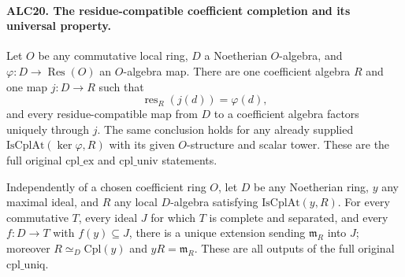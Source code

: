 \paragraph{ALC20. The residue-compatible coefficient completion and its universal property.}
\label{claim:ALC20}
Let \(O\) be any commutative local ring, \(D\) a
Noetherian \(O\)-algebra, and
\(\varphi:D\to\operatorname{Res}(O)\) an
\(O\)-algebra map.  There are one coefficient algebra
\(R\) and one map \(j:D\to R\) such that
\[
          \operatorname{res}_R(j(d))=\varphi(d),
                                                        \tag{ALC.24}
\]
and every residue-compatible map from \(D\) to a coefficient
algebra factors uniquely through \(j\).  The same conclusion
holds for any already supplied \(\mathrm{IsCplAt}(\ker\varphi,R)\)
with its given \(O\)-structure and scalar tower.  These
are the full original \(\mathrm{cpl\_ex}\) and
\(\mathrm{cpl\_univ}\) statements.

Independently of a chosen coefficient ring \(O\), let
\(D\) be any Noetherian ring, \(y\) any maximal ideal,
and \(R\) any local \(D\)-algebra satisfying
\(\mathrm{IsCplAt}(y,R)\).  For every commutative \(T\),
every ideal \(J\) for which \(T\) is complete and
separated, and every \(f:D\to T\) with \(f(y)\subseteq J\),
there is a unique extension sending \(\mathfrak m_R\)
into \(J\); moreover
\(R\simeq_D\mathrm{Cpl}(y)\) and \(yR=\mathfrak m_R\).
These are all outputs of the full original
\(\mathrm{cpl\_uniq}\).


